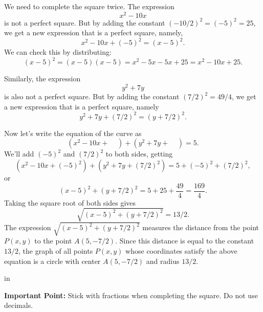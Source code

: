 \documentclass{ximera}
\newcommand{\pskip}{\vskip 0.1 in}
\begin{document}
\begin{explanation}
We need to complete the square twice. The expression
\[
     x^2 - 10x
\]
is not a perfect square. But by adding the constant $(-10/2)^2 = (-5)^2 = 25$, we get a new expression that is a perfect square, namely,
\[
     x^2 -10x + (-5)^2 = (x-5)^2 .
\]
We can check this by distributing:
\[
    (x-5)^2 = (x-5)(x-5) = x^2 -5x -5x + 25 = x^2 - 10x + 25 .
\]

Similarly, the expression
\[
   y^2 + 7y
\]
is also not a perfect square. But by adding the constant $(7/2)^2 = 49/4$, we get a new expression that is a perfect square, namely
\[
     y^2 + 7y + (7/2)^2 = (y+7/2)^2 .
\]

Now let's write the equation of the curve as
\[
     (x^2  - 10x + \;\;\;\; ) + (y^2 + 7y + \;\;\;\; ) = 5 .
\]
We'll add $(-5)^2$ and $(7/2)^2$ to both sides, getting
\[
     (x^2  - 10x + (-5)^2 ) + (y^2 + 7y + (7/2)^2 ) = 5 + (-5)^2 + (7/2)^2 ,
\]
or
\[
    (x-5)^2 + (y+7/2)^2 = 5 + 25 + \frac{49}{4} = \frac{169}{4} .
\]
Taking the square root of both sides gives
\[
    \sqrt{(x-5)^2 + (y+7/2)^2} = 13/2 .
\]
The expression $\sqrt{(x-5)^2 + (y+7/2)^2}$ measures the distance from the point $P(x,y)$ to the point $A(5,-7/2)$. Since this distance is equal to the constant $13/2$, the graph of all points $P(x,y)$ whose coordinates satisfy the above equation is a circle with center $A(5,-7/2)$ and radius $13/2$.

\pskip 

{\bf Important Point:} Stick with fractions when completing the square. Do not use decimals.

\end{explanation}
\end{document}
